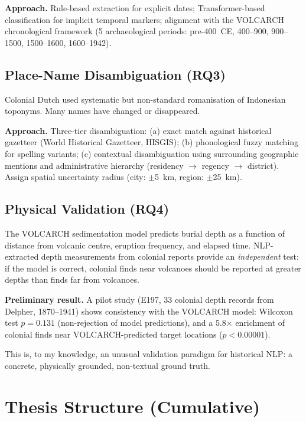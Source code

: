 \documentclass[11pt,a4paper]{article}
\begin{document}
\textbf{Approach.} Rule-based extraction for explicit dates; Transformer-based classification for implicit temporal markers; alignment with the VOLCARCH chronological framework (5 archaeological periods: pre-400~CE, 400--900, 900--1500, 1500--1600, 1600--1942).

\subsection{Place-Name Disambiguation (RQ3)}

Colonial Dutch used systematic but non-standard romanisation of Indonesian toponyms. Many names have changed or disappeared.

\textbf{Approach.} Three-tier disambiguation: (a) exact match against historical gazetteer (World Historical Gazetteer, HISGIS); (b) phonological fuzzy matching for spelling variants; (c) contextual disambiguation using surrounding geographic mentions and administrative hierarchy (residency $\rightarrow$ regency $\rightarrow$ district). Assign spatial uncertainty radius (city: $\pm$5~km, region: $\pm$25~km).

\subsection{Physical Validation (RQ4)}

The VOLCARCH sedimentation model predicts burial depth as a function of distance from volcanic centre, eruption frequency, and elapsed time. NLP-extracted depth measurements from colonial reports provide an \emph{independent} test: if the model is correct, colonial finds near volcanoes should be reported at greater depths than finds far from volcanoes.

\textbf{Preliminary result.} A pilot study (E197, 33 colonial depth records from Delpher, 1870--1941) shows consistency with the VOLCARCH model: Wilcoxon test $p = 0.131$ (non-rejection of model predictions), and a 5.8$\times$ enrichment of colonial finds near VOLCARCH-predicted target locations ($p < 0.00001$).

This is, to my knowledge, an unusual validation paradigm for historical NLP: a concrete, physically grounded, non-textual ground truth.

\section{Thesis Structure (Cumulative)}
\end{document}
